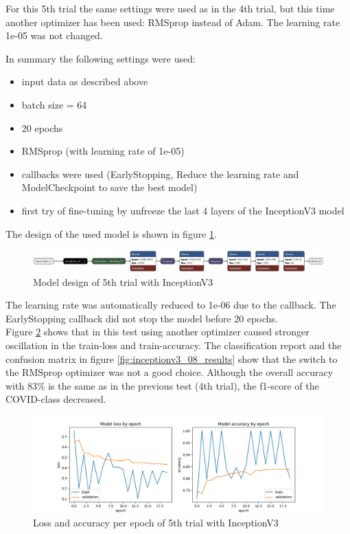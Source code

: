 \documentclass{article}
\begin{document}
For this 5th trial the same settings were used as in the 4th trial, but this time another optimizer has been used: RMSprop instead of Adam. The learning rate 1e-05 was not changed. 

In summary the following settings were used: 
\begin{itemize}
\item input data as described above
\item batch size = 64
\item 20 epochs 
\item RMSprop (with learning rate of 1e-05)
\item callbacks were used (EarlyStopping, Reduce the learning rate and ModelCheckpoint to save the best model)
\item first try of fine-tuning by unfreeze the last 4 layers of the InceptionV3 model
\end{itemize}

The design of the used model is shown in figure \ref{fig:inceptionv3_08.keras_model_design}.
\begin{figure}%
    \centering
    \includegraphics[width=1.0\linewidth]{inceptionv3_08.keras_model_design_nice.png}
    \caption{Model design of 5th trial with InceptionV3}
    \label{fig:inceptionv3_08.keras_model_design}
\end{figure}

The learning rate was automatically reduced to 1e-06 due to the callback. The EarlyStopping callback did not stop the model before 20 epochs.\\
Figure \ref{fig:inceptionv3_08_loss_accuracy} shows that in this test using another optimizer caused stronger oscillation in the train-loss and train-accuracy. The classification report and the confusion matrix in figure \ref{fig:inceptionv3_08_results} show that the switch to the RMSprop optimizer was not a good choice. Although the overall accuracy with 83\% is the same as in the previous test (4th trial), the f1-score of the COVID-class decreased.\\ 

\begin{figure}%
    \centering
    \includegraphics[width=1.0\linewidth]{inceptionv3_08_loss_accuracy.png}
    \caption{Loss and accuracy per epoch of 5th trial with InceptionV3}
    \label{fig:inceptionv3_08_loss_accuracy}
\end{figure}
\end{document}
